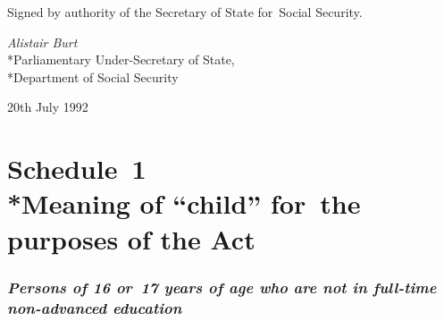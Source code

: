 \documentclass[a4paper,12pt]{article}
\begin{document}
%
%
%
%

\bigskip

Signed by authority of the Secretary of State for~Social Security.

{\raggedleft
\emph{Alistair Burt}\\*Parliamentary Under-Secretary of State,\\*Department of Social Security

}

20th July 1992

\small

\part[Schedule~1 --- Meaning of ``child'' for~the purposes of the Act]{Schedule~1\\*Meaning of ``child'' for~the purposes of the Act}

\renewcommand\parthead{--- Schedule~1}

\section*{\itshape Persons of 16 or~17 years of age who are not in full-time non-advanced education}
\end{document}
